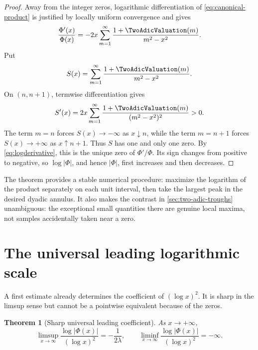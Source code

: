 \documentclass[11pt,oneside]{article}
\newtheorem{theorem}{Theorem}[section]
\theoremstyle{definition}
\theoremstyle{remark}
\newcommand{\PhiF}{\Phi}
\begin{document}
\begin{proof}
Away from the integer zeros, logarithmic differentiation of
\eqref{eq:canonical-product} is justified by locally uniform convergence and
gives
\begin{equation}
 \frac{\PhiF'(x)}{\PhiF(x)}
 =-2x\sum_{m=1}^{\infty}
 \frac{1+\TwoAdicValuation(m)}{m^2-x^2}.
 \label{eq:logderivative}
\end{equation}
Put
\[
 S(x)=\sum_{m=1}^{\infty}
 \frac{1+\TwoAdicValuation(m)}{m^2-x^2}.
\]
On \((n,n+1)\), termwise differentiation gives
\[
 S'(x)=2x\sum_{m=1}^{\infty}
 \frac{1+\TwoAdicValuation(m)}{(m^2-x^2)^2}>0.
\]
The term \(m=n\) forces \(S(x)\to-\infty\) as \(x\downarrow n\), while
the term \(m=n+1\) forces \(S(x)\to+\infty\) as \(x\uparrow n+1\).
Thus \(S\) has one and only one zero.  By \eqref{eq:logderivative}, this is
the unique zero of \(\PhiF'/\PhiF\).  Its sign changes from positive to
negative, so \(\log|\PhiF|\), and hence \(|\PhiF|\), first increases and then
decreases.
\end{proof}

The theorem provides a stable numerical procedure: maximize the logarithm of
the product separately on each unit interval, then take the largest peak in
the desired dyadic annulus.  It also makes the contrast in
\cref{sec:two-adic-troughs} unambiguous: the exceptional small quantities
there are genuine local maxima, not samples accidentally taken near a zero.

\section{The universal leading logarithmic scale}
\label{sec:universal}

A first estimate already determines the coefficient of \((\log x)^2\).
It is sharp in the limsup sense but cannot be a pointwise equivalent because
of the zeros.

\begin{theorem}[Sharp universal leading coefficient]
\label{thm:universal-leading}
As \(x\to+\infty\),
\begin{equation}
 \limsup_{x\to\infty}
 \frac{\log|\PhiF(x)|}{(\log x)^2}
 =-\frac{1}{2\lambda},
 \qquad
 \liminf_{x\to\infty}
 \frac{\log|\PhiF(x)|}{(\log x)^2}=-\infty.
 \label{eq:limsup-leading}
\end{equation}
\end{theorem}
\end{document}

